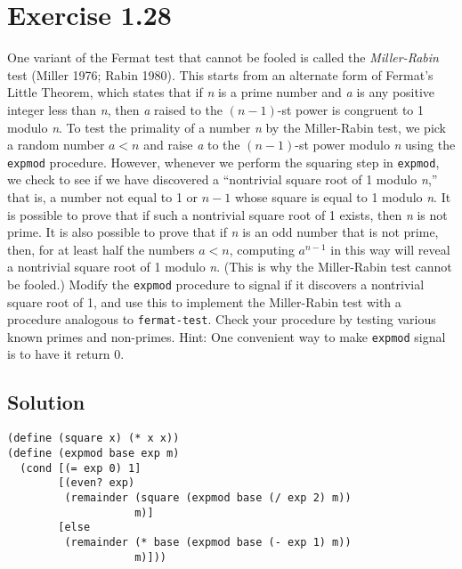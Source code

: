 \documentclass[11pt]{article}
\begin{document}
\section{Exercise 1.28}
\label{sec:org2b25a3a}
One variant of the Fermat test that cannot be fooled is called the
\emph{Miller-Rabin} test (Miller 1976; Rabin 1980). This starts from an alternate
form of Fermat’s Little Theorem, which states that if \emph{n} is a prime number
and \emph{a} is any positive integer less than \emph{n}, then \emph{a} raised to the \((n-1)\)-st power is congruent to 1 modulo \emph{n}. To test the primality of a number
\emph{n} by the Miller-Rabin test, we pick a random number \(a<n\) and raise \emph{a}
to the \((n-1)\)-st power modulo \emph{n} using the \texttt{expmod} procedure. However,
whenever we perform the squaring step in \texttt{expmod}, we check to see if we have
discovered a ``nontrivial square root of 1 modulo \emph{n},'' that is, a number not
equal to 1 or \(n-1\) whose square is equal to 1 modulo \emph{n}. It is possible
to prove that if such a nontrivial square root of 1 exists, then \emph{n} is not
prime. It is also possible to prove that if \emph{n} is an odd number that is not
prime, then, for at least half the numbers \(a<n\), computing \(a^{n-1}\)
in this way will reveal a nontrivial square root of 1 modulo \emph{n}. (This is why
the Miller-Rabin test cannot be fooled.)  Modify the \texttt{expmod} procedure to
signal if it discovers a nontrivial square root of 1, and use this to
implement the Miller-Rabin test with a procedure analogous to
\texttt{fermat-test}. Check your procedure by testing various known primes and
non-primes. Hint: One convenient way to make \texttt{expmod} signal is to have it
return 0.
\subsection{Solution}
\label{sec:org47d7e61}
\begin{verbatim}
(define (square x) (* x x))
(define (expmod base exp m)
  (cond [(= exp 0) 1]
        [(even? exp)
         (remainder (square (expmod base (/ exp 2) m))
                    m)]
        [else
         (remainder (* base (expmod base (- exp 1) m))
                    m)]))
\end{verbatim}
\end{document}
